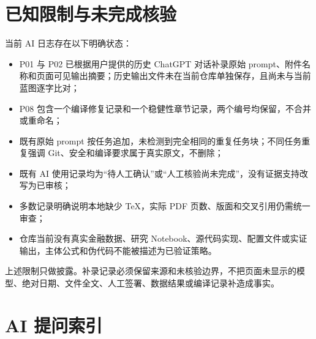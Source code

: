 \section{已知限制与未完成核验}

当前 AI 日志存在以下明确状态：

\begin{itemize}
  \item P01 与 P02 已根据用户提供的历史 ChatGPT 对话补录原始 prompt、附件名称和页面可见输出摘要；历史输出文件未在当前仓库单独保存，且尚未与当前蓝图逐字比对；
  \item P08 包含一个编译修复记录和一个稳健性章节记录，两个编号均保留，不合并或重命名；
  \item 既有原始 prompt 按任务追加，未检测到完全相同的重复任务块；不同任务重复强调 Git、安全和编译要求属于真实原文，不删除；
  \item 既有 AI 使用记录均为“待人工确认”或“人工核验尚未完成”，没有证据支持改写为已审核；
  \item 多数记录明确说明本地缺少 TeX，实际 PDF 页数、版面和交叉引用仍需统一审查；
  \item 仓库当前没有真实金融数据、研究 Notebook、源代码实现、配置文件或实证输出，主体公式和伪代码不能被描述为已验证策略。
\end{itemize}

上述限制只做披露。补录记录必须保留来源和未核验边界，不把页面未显示的模型、绝对日期、文件全文、人工签署、数据结果或编译记录补造成事实。

\section{AI 提问索引}

